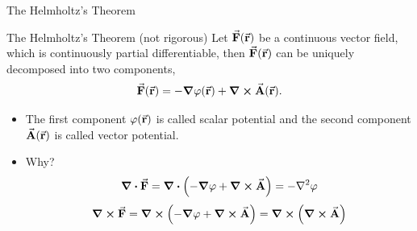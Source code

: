 \documentclass{beamer}
\begin{document}
\begin{frame}{The Helmholtz's Theorem}
    \begin{block}{The Helmholtz's Theorem (not rigorous)}
        Let $\va{F}(\va{r})$  be a continuous vector field, which is continuously partial differentiable, then $\va{F}(\va{r})$ can be uniquely decomposed into two components,
        \begin{equation}
            \va{F} (\va{r}) = -\grad{\varphi(\va{r})} + \curl{\va{A}(\va{r})}.
        \end{equation}
    \end{block}

    \begin{itemize}
        \item The first component $\varphi(\va{r})$ is called scalar potential and the second component $\va{A} (\va{r})$ is called vector potential.
        \item Why?
        \begin{equation}
            \div{\va{F}} = \div(-\grad{\varphi} + \curl{\va{A}}) = -\laplacian{\varphi}
        \end{equation}
        \begin{equation}
            \curl{\va{F}} = \curl(-\grad{\varphi} + \curl{\va{A}}) = \curl(\curl{\va{A}})
        \end{equation}
    \end{itemize}

\end{frame}
\end{document}
